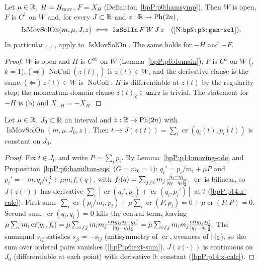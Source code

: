 \begin{lemma}\label{bpP:p14:moving-ode}
Let $\mu\in\mathbb{R}$, $H=H_{\rm mov}$, $F=X_H$ (Definition~\ref{bpP:p0:hamsymp}). Then $W$ is open, $F$ is $C^1$ on $W$ and, for every $J\subset\mathbb{R}$ and $z:\mathbb{R}\to\mathrm{Ph}(2n)$,
\[\operatorname{IsMovSolOn}(m,\mu,J,z)\iff\texttt{IsSolIn}\,F\,W\,J\,z\quad(\textup{[N:\texttt{bpN:p3:gen-sol}]}).\]
In particular , , ,  apply to $\operatorname{IsMovSolOn}$. The same holds for $-H$ and $-F$.
\end{lemma}
\begin{proof}
\label{stepP:p14:mo-reg} $W$ is open and $H$ is $C^\infty$ on $W$ (Lemma~\ref{bpP:p6:domain}); $F$ is $C^1$ on $W$ (, $k=1$).
\label{stepP:p14:mo-eq} ($\Rightarrow$) $\operatorname{NoColl}(z(t)_1)$ is $z(t)\in W$, and the derivative clause is the same. ($\Leftarrow$) $z(t)\in W$ is $\operatorname{NoColl}$; $H$ is differentiable at $z(t)$ by the regularity step; the momentum-domain clause $z(t)_2\in\texttt{univ}$ is trivial. The statement for $-H$ is (b) and $X_{-H}=-X_H$.
\end{proof}

\begin{proposition}\label{bpP:p14:ang-mom}
Let $\mu\in\mathbb{R}$, $J_0\subset\mathbb{R}$ an interval and $z:\mathbb{R}\to\mathrm{Ph}(2n)$ with $\operatorname{IsMovSolOn}(m,\mu,J_0,z)$. Then $t\mapsto J(z(t))=\sum_i\operatorname{cr}(q_i(t),p_i(t))$ is constant on $J_0$.
\end{proposition}
\begin{proof}
\label{stepP:p14:am-eq} Fix $t\in J_0$ and write $P=\sum_ip_i$. By Lemma~\ref{bpP:p14:moving-ode} and Proposition~\ref{bpP:p6:hamilton-eqs} ($G=m_0=1$): $q_i'=p_i/m_i+\mu P$ and $p_i'=-m_i\,q_i/r_i^3+\mu m_if_i(q)$, with $f_i(q)=\sum_{j\ne i}m_j\frac{q_j-q_i}{\lvert q_j-q_i\rvert_2^3}$.
\label{stepP:p14:am-der} $\operatorname{cr}$ is bilinear, so $J(z(\cdot))$ has derivative $\sum_i[\operatorname{cr}(q_i',p_i)+\operatorname{cr}(q_i,p_i')]$ at $t$ (\ref{bpP:p14:x-calc}). First sum: $\sum_i\operatorname{cr}(p_i/m_i,p_i)+\mu\sum_i\operatorname{cr}(P,p_i)=0+\mu\operatorname{cr}(P,P)=0$. Second sum: $\operatorname{cr}(q_i,q_i)=0$ kills the central term, leaving $\mu\sum_im_i\operatorname{cr}(q_i,f_i)=\mu\sum_{i\ne j}m_im_j\frac{\operatorname{cr}(q_i,q_j-q_i)}{\lvert q_j-q_i\rvert_2^3}=\mu\sum_{i\ne j}m_im_j\frac{\operatorname{cr}(q_i,q_j)}{\lvert q_j-q_i\rvert_2^3}$. The summand $s_{ij}$ satisfies $s_{ji}=-s_{ij}$ (antisymmetry of $\operatorname{cr}$, evenness of $\lvert \cdot\rvert_2$), so the sum over ordered pairs vanishes (\ref{bpP:p6:ext-sum}).
\label{stepP:p14:am-const} $J(z(\cdot))$ is continuous on $J_0$ (differentiable at each point) with derivative $0$: constant (\ref{bpP:p14:x-calc}).
\end{proof}

